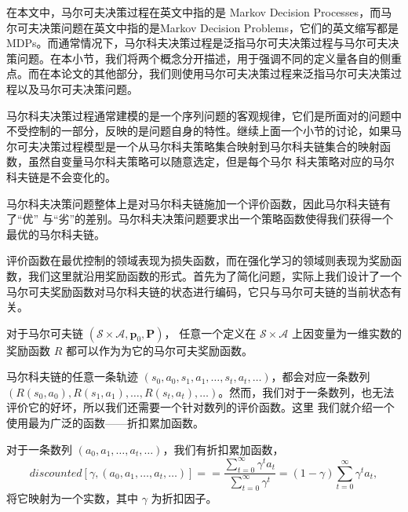 在本文中，马尔可夫决策过程在英文中指的是 Markov Decision Processes，而马尔可夫决策问题在英文中指的是Markov Decision Problems，它们的英文缩写都是MDPs。而通常情况下，马尔科夫决策过程是泛指马尔可夫决策过程与马尔可夫决策问题。在本小节，我们将两个概念分开描述，用于强调不同的定义量各自的侧重点。而在本论文的其他部分，我们则使用马尔可夫决策过程来泛指马尔可夫决策过程以及马尔可夫决策问题。

马尔科夫决策过程通常建模的是一个序列问题的客观规律，它们是所面对的问题中不受控制的一部分，反映的是问题自身的特性。继续上面一个小节的讨论，如果马尔可夫决策过程模型是一个从马尔科夫策略集合映射到马尔科夫链集合的映射函数，虽然自变量马尔科夫策略可以随意选定，但是每个马尔
科夫策略对应的马尔科夫链是不会变化的。

马尔科夫决策问题整体上是对马尔科夫链施加一个评价函数，因此马尔科夫链有了``优'' 与``劣''的差别。马尔科夫决策问题要求出一个策略函数使得我们获得一个最优的马尔科夫链。

评价函数在最优控制的领域表现为损失函数，而在强化学习的领域则表现为奖励函数，我们这里就沿用奖励函数的形式。首先为了简化问题，实际上我们设计了一个马尔可夫奖励函数对马尔科夫链的状态进行编码，它只与马尔可夫链的当前状态有关。
\begin{definition}[马尔可夫奖励函数]
    对于马尔可夫链 $(\mathcal{S} \times \mathcal{A}, \mathbf{p}_0, \mathbf{P})$，
    任意一个定义在 $\mathcal{S} \times \mathcal{A}$ 上因变量为一维实数的奖励函数 $R$
    都可以作为为它的马尔可夫奖励函数。
\end{definition}

马尔科夫链的任意一条轨迹 $(s_0, a_0, s_1, a_1, \ldots, s_t, a_t, \ldots)$，都会对应一条数列 $(R(s_0, a_0), R(s_1, a_1), \ldots, R(s_t, a_t), \ldots)$。然而，我们对于一条数列，也无法评价它的好坏，所以我们还需要一个针对数列的评价函数。这里
我们就介绍一个使用最为广泛的函数——折扣累加函数。
\begin{definition}[折扣累加函数]
    对于一条数列 $(a_0, a_1, \ldots, a_t, \ldots)$，我们有折扣累加函数，
    \begin{equation}
        discounted[\gamma, (a_0, a_1, \ldots, a_t, \ldots)] = 
        = \frac{\sum^\infty_{t=0} \gamma^t a_t}{\sum^\infty_{t=0} \gamma^t}
        = (1 - \gamma)\sum^\infty_{t=0} \gamma^t a_t,
    \end{equation}
    将它映射为一个实数，其中 $\gamma$ 为折扣因子。
\end{definition}

